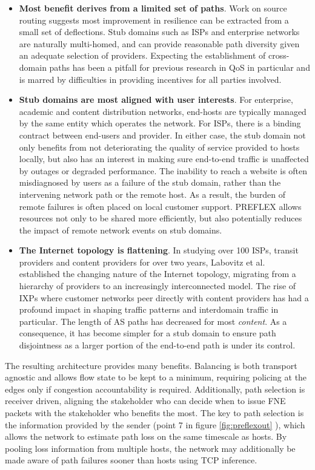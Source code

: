 \begin{itemize}
\item{
    \textbf{Most benefit derives from a limited set of paths}.
    Work on source routing \cite{Gummadi:2004p131,Yang:2006p405} suggests most improvement in resilience can be extracted from a small set of deflections.
    Stub domains such as \acp{ISP} and enterprise networks are naturally multi-homed, and can provide reasonable path diversity given an adequate selection of providers.
    Expecting the establishment of cross-domain paths has been a pitfall for previous research in \ac{QoS} in particular and is marred by difficulties in providing incentives for all parties involved.
}
\item{
    \textbf{Stub domains are most aligned with user interests}. 
    For enterprise, academic and content distribution networks, end-hosts are typically managed by the same entity which operates the network.
    For \acp{ISP}, there is a binding contract between end-users and provider.
    In either case, the stub domain not only benefits from not deteriorating the quality of service provided to hosts locally, but also has an interest in making sure end-to-end traffic is unaffected by outages or degraded performance.
    The inability to reach a website is often misdiagnosed by users as a failure of the stub domain, rather than the intervening network path or the remote host.
    As a result, the burden of remote failures is often placed on local customer support.
    \ac{PREFLEX} allows resources not only to be shared more efficiently, but also potentially reduces the impact of remote network events on stub domains.
}

\item{
    \textbf{The Internet topology is flattening}. 
    In studying over 100 \acp{ISP}, transit providers and content providers for over two years, Labovitz et al.\ \cite{Labovitz:2010p175} established the changing nature of the Internet topology, migrating from a hierarchy of providers to an increasingly interconnected model.
    The rise of \acp{IXP} where customer networks peer directly with content providers has had a profound impact in shaping traffic patterns and interdomain traffic in particular.
    The length of \ac{AS} paths has decreased for most \emph{content}.
    As a consequence, it has become simpler for a stub domain to ensure path disjointness as a larger portion of the end-to-end path is under its control.
}
\end{itemize}

The resulting architecture provides many benefits. 
Balancing is both transport agnostic and allows flow state to be kept to a minimum, requiring policing at the edges only if congestion accountability is required. 
Additionally, path selection is receiver driven, aligning the stakeholder who can decide when to issue \ac{FNE} packets with the stakeholder who benefits the most. 
The key to path selection is the information provided by the sender (point 7 in figure \ref{fig:preflexout} ), which allows the network to estimate path loss on the same timescale as hosts. 
By pooling loss information from multiple hosts, the network may additionally be made aware of path failures sooner than hosts using \ac{TCP} inference.

